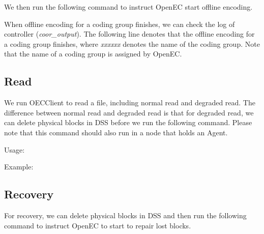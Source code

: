 \documentclass[letterpaper,12pt]{article}
\newcommand{\openec}{{\sf\small OpenEC}\xspace}
\begin{document}
We then run the following command to instruct \openec start offline encoding.

\begin{center}
\noindent{}
\end{center}

When offline encoding for a coding group finishes, we can check the log of controller ({\sl coor\_output}).
The following line denotes that the offline encoding for a coding group finishes, where {\sl xxxxxx} denotes
the name of the coding group. Note that the name of a coding group is assigned by \openec.

\begin{center}
\noindent{}
\end{center}


\subsection{Read}

We run OECClient to read a file, including normal read and degraded read. 
The difference between normal read and degraded read is that for degraded read, we
can delete physical blocks in DSS before we run the following command.
Please note that this command should also run in a node that holds an Agent.

Usage:
\begin{center}
\noindent{}
\end{center}

Example:
\begin{center}
\noindent{}
\end{center}

\subsection{Recovery}

For recovery, we can delete physical blocks in DSS and then run the following command to instruct \openec 
to start to repair lost blocks.

\begin{center}
\noindent{}
\end{center}
\end{document}
